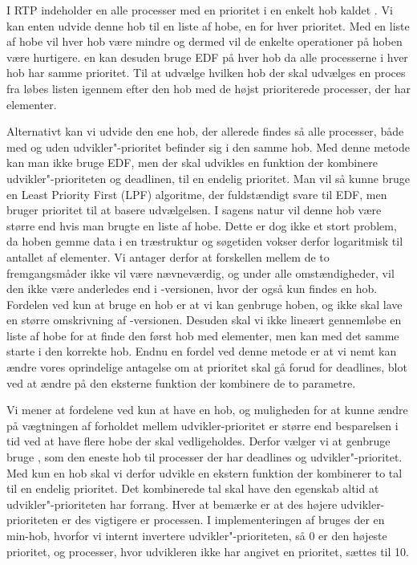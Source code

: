 I RTP  indeholder \sched en alle processer med en prioritet i en enkelt hob kaldet . Vi kan enten udvide denne hob til en liste af hobe, en for hver prioritet. Med en liste af hobe vil hver hob være mindre og dermed vil de enkelte operationer på hoben være hurtigere. \Sched en kan desuden bruge EDF på hver hob da alle processerne i hver hob har samme prioritet. Til at udvælge hvilken hob der skal udvælges en proces fra løbes listen igennem efter den hob med de højst prioriterede processer, der har elementer. 

Alternativt kan vi udvide den ene hob, der allerede findes så alle processer, både med og uden udvikler"-prioritet befinder sig i den samme hob. Med denne metode kan man ikke bruge EDF, men der skal udvikles en  funktion der kombinere  udvikler"-prioriteten og deadlinen, til en endelig prioritet. Man vil så kunne bruge en Least Priority First (LPF) algoritme, der fuldstændigt svare til EDF, men bruger prioritet til at basere udvælgelsen. I sagens natur vil denne hob  være større end hvis man brugte en liste af hobe. Dette er dog ikke et stort problem, da hoben gemme data i en træstruktur og  søgetiden vokser derfor logaritmisk til antallet af elementer. Vi antager derfor at forskellen mellem de to fremgangsmåder ikke vil være nævneværdig, og under alle omstændigheder, vil den ikke være anderledes end i -versionen, hvor der også kun findes en hob. Fordelen ved kun at bruge en hob er at vi kan genbruge  hoben, og  ikke skal lave en større omskrivning af -versionen. Desuden skal vi ikke lineært gennemløbe en liste af hobe for at finde den først hob med elementer, men kan med det samme starte i den korrekte hob. Endnu en fordel ved denne metode er at vi nemt kan  ændre vores oprindelige antagelse om at prioritet skal gå forud for deadlines, blot ved at ændre på den eksterne funktion der kombinere de to parametre.

Vi mener at fordelene ved kun at have en hob, og muligheden for at kunne ændre på vægtningen af forholdet mellem udvikler-prioritet er større end besparelsen i tid ved at have flere hobe der skal vedligeholdes. Derfor vælger vi  at genbruge bruge , som den eneste hob til  processer der har deadlines og udvikler"-prioritet. Med kun en hob skal vi derfor udvikle en ekstern funktion der kombinerer to tal til en endelig prioritet. Det kombinerede tal skal have den egenskab altid at udvikler"-prioriteten har forrang. Hver at bemærke er at des højere udvikler-prioriteten er des vigtigere er processen. I implementeringen af  bruges der en min-hob, hvorfor vi internt invertere udvikler"-prioriteten, så 0 er den højeste prioritet, og processer, hvor udvikleren ikke har angivet en prioritet, sættes til 10.

